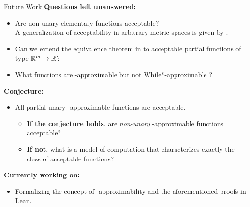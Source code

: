 \begin{frame}{Future Work}
    \pause
    \textbf{Questions left unanswered:}
    \begin{itemize}
        \pause \item Are non-unary elementary functions acceptable? \\
        \pause A generalization of acceptability in arbitrary metric spaces is given by \citet{AbstractVSConcreteComputationOnMetricPartialAlgebras_TuckerZucker_2004}.              
        \pause\item Can we extend the equivalence theorem in \citet{ModelOfCompForPartFunc_MingQuanFuAndJeffZucker} to acceptable partial functions of type $\mathbb{R}^m\to\mathbb{R}$? 

        \pause \item What functions are \WhileCC-approximable but not While*-approximable \citep{ComputationByWhileProgramsOnTopologicalPartialAlgebras_TuckerAndZucker}?
    \end{itemize}
    \pause \textbf{Conjecture:}
    \begin{itemize}
        \item All partial unary \WhileCC-approximable functions are acceptable.
    \begin{itemize}
        \pause \item \textbf{If the conjecture holds}, are \emph{non-unary} \WhileCC-approximable functions acceptable?
        \pause \item  \textbf{If not}, what is a model of computation that characterizes exactly the class of acceptable functions?
    \end{itemize}
    \end{itemize}
    \pause \textbf{Currently working on:}
    \begin{itemize}
        \pause \item {\color{olive}Formalizing the concept of \WhileCC-approximability and the aforementioned proofs in Lean.}
    \end{itemize}
\end{frame}
